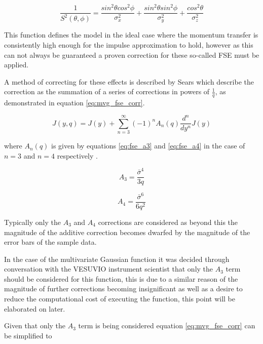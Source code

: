 \documentclass[a4paper]{article}
\begin{document}
\begin{equation}
  \label{eq:multivariate_gaussian_s2}
  \frac{1}{S^{2}(\theta, \phi)}
    = \frac{sin^{2}\theta cos^{2}\phi}{\sigma_{x}^{2}}
    + \frac{sin^{2}\theta sin^{2}\phi}{\sigma_{y}^{2}}
    + \frac{cos^{2}\theta}{\sigma_{z}^{2}}
\end{equation}

This function defines the model in the ideal case where the momentum transfer is
consistently high enough for the impulse approximation to hold, however as this
can not always be guaranteed a proven correction for these so-called \gls*{FSE}
must be applied.

A method of correcting for these effects is described by Sears \cite{Sears1984}
which describe the correction as the summation of a series of corrections in
powers of $\frac{1}{q}$, as demonstrated in equation \ref{eq:mvg_fse_corr}.

\begin{equation}
  \label{eq:mvg_fse_corr}
  J(y, q) =
    J(y) + \sum^{\infty}_{n = 3} (-1)^{n} A_{n}(q) \frac{d^{n}}{dy^{n}} J(y)
\end{equation}

where $A_{n}(q)$ is given by equations \ref{eq:fse_a3} and \ref{eq:fse_a4} in
the case of $n=3$ and $n=4$ respectively \cite{Romanelli2015}.

\begin{equation}
  \label{eq:fse_a3}
  A_{3} = \frac{\bar{\sigma}^{4}}{3q}
\end{equation}

\begin{equation}
  \label{eq:fse_a4}
  A_{4} = \frac{\bar{\sigma}^{6}}{6q^{2}}
\end{equation}

Typically only the $A_{3}$ and $A_{4}$ corrections are considered as beyond this
the magnitude of the additive correction becomes dwarfed by the magnitude of the
error bars of the sample data.

In the case of the multivariate Gaussian function it was decided through
conversation with the VESUVIO instrument scientist that only the $A_{3}$ term
should be considered for this function, this is due to a similar reason of the
magnitude of further corrections becoming insignificant as well as a desire to
reduce the computational cost of executing the function, this point will be
elaborated on later.

Given that only the $A_{3}$ term is being considered equation
\ref{eq:mvg_fse_corr} can be simplified to
\end{document}
